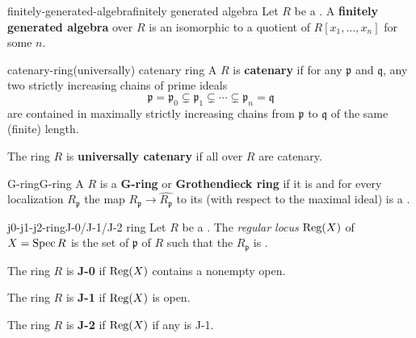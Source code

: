 \begin{topic}{finitely-generated-algebra}{finitely generated algebra}
    Let $R$ be a . A \textbf{finitely generated algebra} over $R$ is an  isomorphic to a quotient of $R[x_1, \ldots, x_n]$ for some $n$.
\end{topic}

\begin{topic}{catenary-ring}{(universally) catenary ring}
    A  $R$ is \textbf{catenary} if for any  $\mathfrak{p}$ and $\mathfrak{q}$, any two strictly increasing chains of prime ideals
    \[ \mathfrak{p} = \mathfrak{p}_0 \subsetneq \mathfrak{p}_1 \subsetneq \cdots \subsetneq \mathfrak{p}_n = \mathfrak{q} \]
    are contained in maximally strictly increasing chains from $\mathfrak{p}$ to $\mathfrak{q}$ of the same (finite) length.
    
    The ring $R$ is \textbf{universally catenary} if all  over $R$ are catenary.
\end{topic}

\begin{topic}{G-ring}{G-ring}
    A  $R$ is a \textbf{G-ring} or \textbf{Grothendieck ring} if it is  and for every localization $R_{\mathfrak{p}}$ the map $R_{\mathfrak{p}} \to \widehat{R_{\mathfrak{p}}}$ to its  (with respect to the maximal ideal) is a .
\end{topic}

\begin{topic}{j0-j1-j2-ring}{J-0/J-1/J-2 ring}
    Let $R$ be a  . The \textit{regular locus} $\textup{Reg}(X)$ of $X = \operatorname{Spec} R$ is the set of  $\mathfrak{p}$ of $R$ such that the  $R_\mathfrak{p}$ is .
    
    The ring $R$ is \textbf{J-0} if $\textup{Reg}(X)$ contains a nonempty open.
    
    The ring $R$ is \textbf{J-1} if $\textup{Reg}(X)$ is open.
    
    The ring $R$ is \textbf{J-2} if $\textup{Reg}(X)$ if any  is J-1.
\end{topic}

